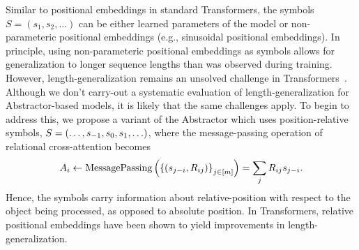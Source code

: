\begin{remark}\rm
    Similar to positional embeddings in standard Transformers, the symbols $S = (s_1, s_2, \ldots)$ can be either learned parameters of the model or non-parameteric positional embeddings (e.g., sinusoidal positional embeddings). In principle, using non-parameteric positional embeddings as symbols allows for generalization to longer sequence lengths than was observed during training. However, length-generalization remains an unsolved challenge in Transformers~\citep{kazemnejadImpactPositionalEncoding2023}. Although we don't carry-out a systematic evaluation of length-generalization for Abstractor-based models, it is likely that the same challenges apply. To begin to address this, we propose a variant of the Abstractor which uses position-relative symbols, $S = \left(\ldots, s_{-1}, s_0, s_1, \ldots\right)$, where the message-passing operation of relational cross-attention becomes
    \begin{equation}\label{eq:position_relative_symbols}
            A_i \gets \mathrm{MessagePassing}\left(\left\{(s_{j-i}, R_{ij})\right\}_{j \in [m]}\right)
            = \sum_{j} R_{ij} s_{j-i}.
    \end{equation}
    Hence, the symbols carry information about relative-position with respect to the object being processed, as opposed to absolute position. In Transformers, relative positional embeddings have been shown to yield improvements in length-generalization.
\end{remark}

%